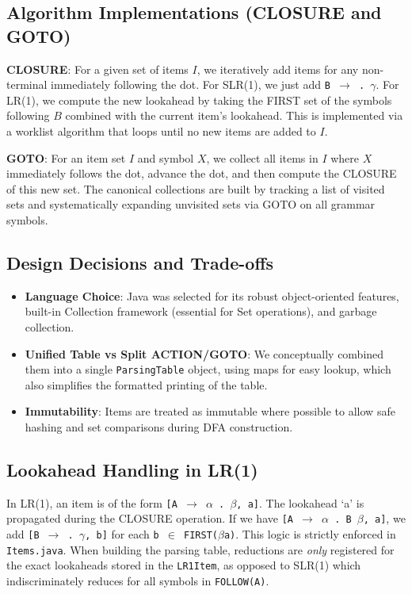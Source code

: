 \documentclass[11pt,a4paper]{article}
\begin{document}
\subsection{Algorithm Implementations (CLOSURE and GOTO)}
\textbf{CLOSURE}: For a given set of items $I$, we iteratively add items for any non-terminal immediately following the dot. For SLR(1), we just add \texttt{B $\rightarrow$ . $\gamma$}. For LR(1), we compute the new lookahead by taking the FIRST set of the symbols following $B$ combined with the current item's lookahead. This is implemented via a worklist algorithm that loops until no new items are added to $I$.

\textbf{GOTO}: For an item set $I$ and symbol $X$, we collect all items in $I$ where $X$ immediately follows the dot, advance the dot, and then compute the CLOSURE of this new set. The canonical collections are built by tracking a list of visited sets and systematically expanding unvisited sets via GOTO on all grammar symbols.

\subsection{Design Decisions and Trade-offs}
\begin{itemize}
    \item \textbf{Language Choice}: Java was selected for its robust object-oriented features, built-in Collection framework (essential for Set operations), and garbage collection.
    \item \textbf{Unified Table vs Split ACTION/GOTO}: We conceptually combined them into a single \texttt{ParsingTable} object, using maps for easy lookup, which also simplifies the formatted printing of the table.
    \item \textbf{Immutability}: Items are treated as immutable where possible to allow safe hashing and set comparisons during DFA construction.
\end{itemize}

\subsection{Lookahead Handling in LR(1)}
In LR(1), an item is of the form \texttt{[A $\rightarrow$ $\alpha$ . $\beta$, a]}. The lookahead `a' is propagated during the CLOSURE operation. If we have \texttt{[A $\rightarrow$ $\alpha$ . B $\beta$, a]}, we add \texttt{[B $\rightarrow$ . $\gamma$, b]} for each \texttt{b $\in$ FIRST($\beta$a)}. This logic is strictly enforced in \texttt{Items.java}. When building the parsing table, reductions are \textit{only} registered for the exact lookaheads stored in the \texttt{LR1Item}, as opposed to SLR(1) which indiscriminately reduces for all symbols in \texttt{FOLLOW(A)}.
\end{document}

